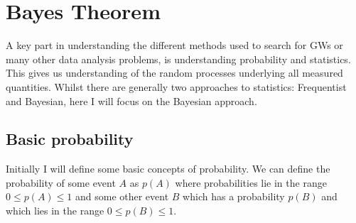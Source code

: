 \section{\label{searchcw:prob} Bayes Theorem}

A key part in understanding the different methods used to search for
\glspl{GW} or many other data analysis problems, is understanding probability
and statistics.  This gives us understanding of the random processes
underlying all measured quantities.  Whilst there are generally two approaches
to statistics: Frequentist and Bayesian, here I will focus on the Bayesian
approach.  

\subsection{\label{searchcw:prob:basic}Basic probability}

Initially I will define some basic concepts of probability.  We can define the
probability of some event $A$ as $p(A)$ where probabilities lie in the range $0 \leq p(A)
\leq 1$ and some other event $B$ which has a probability $p(B)$ and
which lies in the range $0 \leq p(B) \leq 1$.

